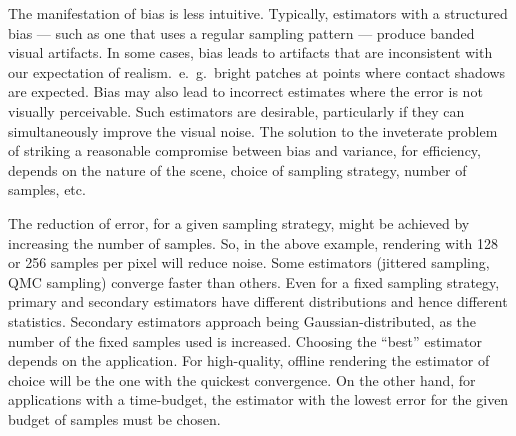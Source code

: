 The manifestation of bias is less intuitive. Typically, estimators with a structured bias --- such as one that uses a regular sampling pattern --- produce banded visual artifacts. In some cases, bias leads to artifacts that are inconsistent with our expectation of realism.~e.~g.~bright patches at points where contact shadows are expected. Bias may also lead to incorrect estimates where the error is not visually perceivable. Such estimators are desirable, particularly if they can simultaneously improve the visual noise. The solution to the inveterate problem of striking a reasonable compromise between bias and variance, for efficiency, depends on the nature of the scene, choice of sampling strategy, number of samples, etc. 

The reduction of error, for a given sampling strategy, might be achieved by increasing the number of samples. So, in the above example, rendering with 128 or 256 samples per pixel will reduce noise. 
Some estimators (jittered sampling, QMC sampling) converge faster than others. Even for a fixed sampling strategy, primary and secondary estimators have different distributions and hence different statistics. Secondary estimators approach being Gaussian-distributed, as the number of the fixed samples used is increased. Choosing the ``best'' estimator depends on the application. For high-quality, offline rendering the estimator of choice will be the one with the quickest convergence. On the other hand, for applications with a time-budget, the estimator with the lowest error for the given budget of samples must be chosen.



